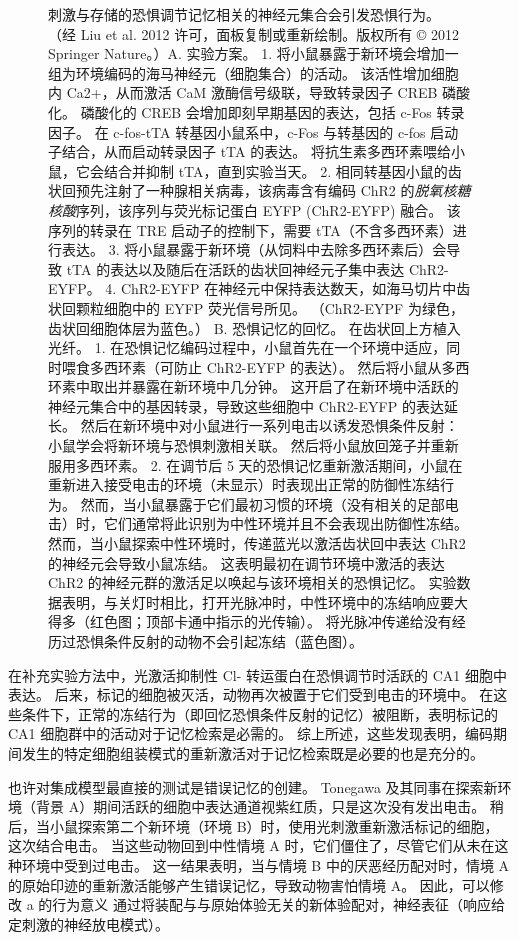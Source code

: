 \begin{figure}[htbp]
	\caption{刺激与存储的恐惧调节记忆相关的神经元集合会引发恐惧行为。 （经 Liu et al. 2012 许可，面板复制或重新绘制。版权所有 © 2012 Springer Nature。）A. 实验方案。 1. 将小鼠暴露于新环境会增加一组为环境编码的海马神经元（细胞集合）的活动。 该活性增加细胞内 Ca2+，从而激活 CaM 激酶信号级联，导致转录因子 CREB 磷酸化。 磷酸化的 CREB 会增加即刻早期基因的表达，包括 c-Fos 转录因子。 在 c-fos-tTA 转基因小鼠系中，c-Fos 与转基因的 c-fos 启动子结合，从而启动转录因子 tTA 的表达。 将抗生素多西环素喂给小鼠，它会结合并抑制 tTA，直到实验当天。 2. 相同转基因小鼠的齿状回预先注射了一种腺相关病毒，该病毒含有编码 ChR2 的\textit{脱氧核糖核酸}序列，该序列与荧光标记蛋白 EYFP (ChR2-EYFP) 融合。 该序列的转录在 TRE 启动子的控制下，需要 tTA（不含多西环素）进行表达。 3. 将小鼠暴露于新环境（从饲料中去除多西环素后）会导致 tTA 的表达以及随后在活跃的齿状回神经元子集中表达 ChR2-EYFP。 4. ChR2-EYFP 在神经元中保持表达数天，如海马切片中齿状回颗粒细胞中的 EYFP 荧光信号所见。 （ChR2-EYPF 为绿色，齿状回细胞体层为蓝色。） B. 恐惧记忆的回忆。 在齿状回上方植入光纤。 1. 在恐惧记忆编码过程中，小鼠首先在一个环境中适应，同时喂食多西环素（可防止 ChR2-EYFP 的表达）。 然后将小鼠从多西环素中取出并暴露在新环境中几分钟。 这开启了在新环境中活跃的神经元集合中的基因转录，导致这些细胞中 ChR2-EYFP 的表达延长。 然后在新环境中对小鼠进行一系列电击以诱发恐惧条件反射：小鼠学会将新环境与恐惧刺激相关联。 然后将小鼠放回笼子并重新服用多西环素。 2. 在调节后 5 天的恐惧记忆重新激活期间，小鼠在重新进入接受电击的环境（未显示）时表现出正常的防御性冻结行为。 然而，当小鼠暴露于它们最初习惯的环境（没有相关的足部电击）时，它们通常将此识别为中性环境并且不会表现出防御性冻结。 然而，当小鼠探索中性环境时，传递蓝光以激活齿状回中表达 ChR2 的神经元会导致小鼠冻结。 这表明最初在调节环境中激活的表达 ChR2 的神经元群的激活足以唤起与该环境相关的恐惧记忆。 实验数据表明，与关灯时相比，打开光脉冲时，中性环境中的冻结响应要大得多（红色图；顶部卡通中指示的光传输）。 将光脉冲传递给没有经历过恐惧条件反射的动物不会引起冻结（蓝色图）。}
	\label{fig:54_11}
\end{figure}


在补充实验方法中，光激活抑制性 Cl- 转运蛋白在恐惧调节时活跃的 CA1 细胞中表达。
后来，标记的细胞被灭活，动物再次被置于它们受到电击的环境中。
在这些条件下，正常的冻结行为（即回忆恐惧条件反射的记忆）被阻断，表明标记的 CA1 细胞群中的活动对于记忆检索是必需的。
综上所述，这些发现表明，编码期间发生的特定细胞组装模式的重新激活对于记忆检索既是必要的也是充分的。


也许对集成模型最直接的测试是错误记忆的创建。 Tonegawa 及其同事在探索新环境（背景 A）期间活跃的细胞中表达通道视紫红质，只是这次没有发出电击。
稍后，当小鼠探索第二个新环境（环境 B）时，使用光刺激重新激活标记的细胞，这次结合电击。
当这些动物回到中性情境 A 时，它们僵住了，尽管它们从未在这种环境中受到过电击。
这一结果表明，当与情境 B 中的厌恶经历配对时，情境 A 的原始印迹的重新激活能够产生错误记忆，导致动物害怕情境 A。
因此，可以修改 a 的行为意义 通过将装配与与原始体验无关的新体验配对，神经表征（响应给定刺激的神经放电模式）。



